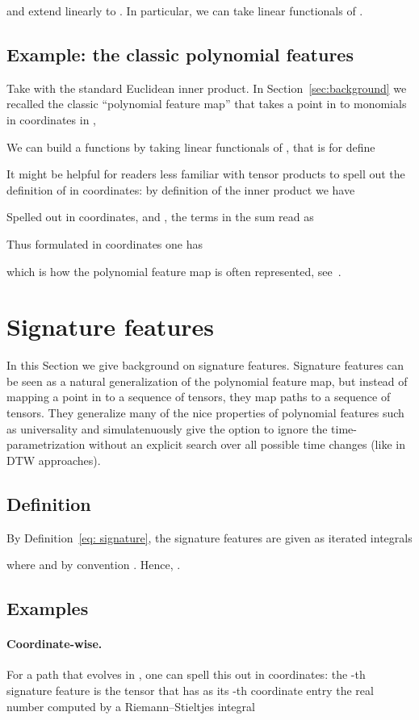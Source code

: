 \documentclass{article}
\begin{document}
and extend linearly to .
In particular, we can take linear functionals of .

\subsection{Example: the classic polynomial features}
Take  with the standard Euclidean inner product.
In Section~\ref{sec:background} we recalled the classic ``polynomial feature map'' that takes a point in  to monomials in coordinates in ,

We can build a functions  by taking linear functionals of , that is for  define

It might be helpful for readers less familiar with tensor products to spell out the definition of  in coordinates:
by definition of the inner product we have 

Spelled out in coordinates,  and , the terms in the sum read as 

Thus formulated in coordinates one has 

which is how the polynomial feature map is often represented, see~\cite{Rasmussen2006Gaussian}.  


  \section{Signature features}\label{app:signatures}
  In this Section we give background on signature features. 
  Signature features can  be seen as a natural generalization of the polynomial feature map, but instead of mapping a point in  to a sequence of tensors, they map paths  to a sequence of tensors. 
  They generalize many of the nice properties of polynomial features such as universality and simulatenuously give the option to ignore the time-parametrization without an explicit search over all possible time changes (like in DTW approaches). 
	\subsection{Definition} \label{appendix:sig_properties}
	By Definition~\eqref{eq: signature}, the signature features are given as iterated integrals  

where  and by convention .
Hence, .
\subsection{Examples}
\paragraph{Coordinate-wise.}
For a path  that evolves in , one can spell this out in coordinates: the -th signature feature  is the tensor that has as its -th coordinate entry the real number computed by a Riemann--Stieltjes integral
\end{document}
